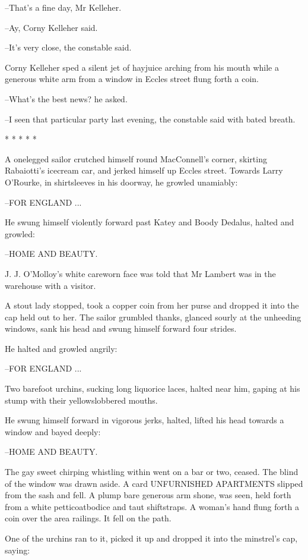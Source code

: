 --That's a fine day, Mr Kelleher.

--Ay, Corny Kelleher said.

--It's very close, the constable said.

Corny Kelleher sped a silent jet of hayjuice arching from his mouth
while a generous white arm from a window in Eccles street flung forth a
coin.

--What's the best news? he asked.

--I seen that particular party last evening, the constable said with bated
breath.


    * * * * *


A onelegged sailor crutched himself round MacConnell's corner,
skirting Rabaiotti's icecream car, and jerked himself up Eccles street.
Towards Larry O'Rourke, in shirtsleeves in his doorway, he growled
unamiably:

--FOR ENGLAND ...

He swung himself violently forward past Katey and Boody Dedalus,
halted and growled:

--HOME AND BEAUTY.

J. J. O'Molloy's white careworn face was told that Mr Lambert was
in the warehouse with a visitor.

A stout lady stopped, took a copper coin from her purse and dropped
it into the cap held out to her. The sailor grumbled thanks, glanced
sourly at the unheeding windows, sank his head and swung himself forward
four strides.

He halted and growled angrily:

--FOR ENGLAND ...

Two barefoot urchins, sucking long liquorice laces, halted near him,
gaping at his stump with their yellowslobbered mouths.

He swung himself forward in vigorous jerks, halted, lifted his head
towards a window and bayed deeply:

--HOME AND BEAUTY.

The gay sweet chirping whistling within went on a bar or two, ceased.
The blind of the window was drawn aside. A card UNFURNISHED APARTMENTS
slipped from the sash and fell. A plump bare generous arm shone, was seen,
held forth from a white petticoatbodice and taut shiftstraps. A woman's
hand flung forth a coin over the area railings. It fell on the path.

One of the urchins ran to it, picked it up and dropped it into the
minstrel's cap, saying:

